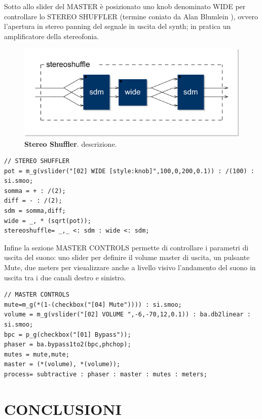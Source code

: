 \documentclass[
	a4paper,
	twocolumn
	]{article}
\begin{document}
Sotto allo slider del MASTER è posizionato uno knob denominato WIDE per
controllare lo STEREO SHUFFLER (termine coniato da Alan Blumlein \cite{ab58} ),
ovvero l'apertura in stereo panning del segnale in uscita del synth; in pratica
un amplificatore della stereofonia.

\begin{figure}[h]%
\begin{center}
\includegraphics[width=.47\textwidth]{img/mid-side-shuffler.pdf}
\caption{\textbf{Stereo Shuffler}. descrizione.}
\label{shuff}
\end{center}
\end{figure}

\begin{lstlisting}
// STEREO SHUFFLER
pot = m_g(vslider("[02] WIDE [style:knob]",100,0,200,0.1)) : /(100) : si.smoo;
somma = + : /(2);
diff = - : /(2);
sdm = somma,diff;
wide = _, * (sqrt(pot));
stereoshuffle= _,_ <: sdm : wide <: sdm;
\end{lstlisting}

Infine la sezione MASTER CONTROLS permette di controllare i parametri di uscita
del suono: uno slider per definire il volume master di uscita, un pulsante Mute,
due meters per visualizzare anche a livello visivo l'andamento del suono in
uscita tra i due canali destro e sinistro.

\begin{lstlisting}
// MASTER CONTROLS
mute=m_g(*(1-(checkbox("[04] Mute")))) : si.smoo;
volume = m_g(vslider("[02] VOLUME ",-6,-70,12,0.1)) : ba.db2linear : si.smoo;
bpc = p_g(checkbox("[01] Bypass"));
phaser = ba.bypass1to2(bpc,phchop);
mutes = mute,mute;
master = (*(volume), *(volume));
process= subtractive : phaser : master : mutes : meters;
\end{lstlisting}

\section*{CONCLUSIONI}
\end{document}
